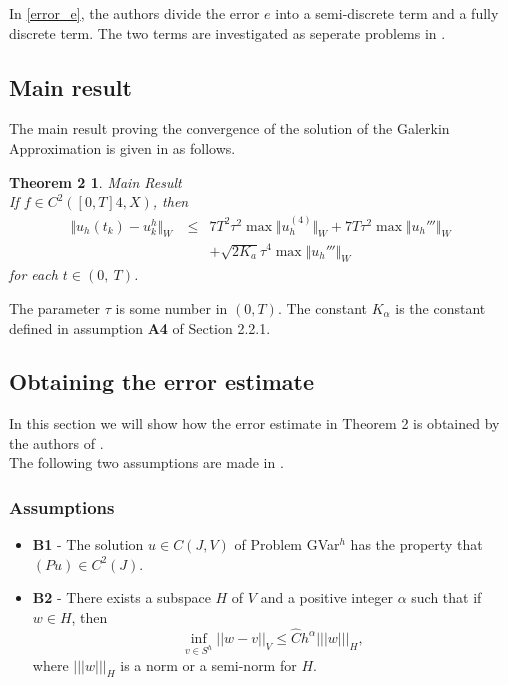 \documentclass[../../main.tex]{subfiles}
\begin{document}
In \eqref{error_e}, the authors divide the error $e$ into a semi-discrete term and a fully discrete term. The two terms are investigated as seperate problems in \cite{BV13}.\\

\subsection{Main result}

The main result proving the convergence of the solution of the Galerkin Approximation is given in \cite{BV13} as follows.

\newtheorem*{DC_Thm5}{Theorem 2}
\begin{DC_Thm5}
	{Main Result}\\
	If $f\in C^{2}([0,T]4,X)$, then
	\begin{eqnarray*}
		\Vert u_{h}(t_{k})-u_{k}^{h}\Vert_{W}\ & \leq & 7T^{2}\tau^{2}\max\Vert u_{h}^{(4)}\Vert_{W}+7T\tau^{2}\max\Vert u_{h}'''\Vert_{W}\\
		& & + \sqrt{2K_{a}}\tau^{4}\max\Vert u_{h}'''\Vert_{W}
	\end{eqnarray*}
	for each $t\in(0,\ T)$.
\end{DC_Thm5}

The parameter $\tau$ is some number in $(0,T)$. The constant $K_\alpha$ is the constant defined in assumption \textbf{A4} of Section 2.2.1.

\subsection{Obtaining the error estimate}
In this section we will show how the error estimate in Theorem 2 is obtained by the authors of \cite{BV13}.\\

The following two assumptions are made in \cite{BV13}.
\subsubsection*{Assumptions}
\begin{itemize}
	\item[] \textbf{B1} - The solution $u \in C(J,V)$ of Problem GVar$^h$ has the property that $(Pu) \in C^2(J)$.

	\item[] \textbf{B2} - There exists a subspace $H$ of $V$ and a positive integer $\alpha$ such that if $w \in H$, then $$\inf_{v\in S^{h}}||w-v||_V \leq \hat{C} h^\alpha|||w|||_H,$$ where $|||w|||_H$ is a norm or a semi-norm for $H$.
\end{itemize}
\end{document}
